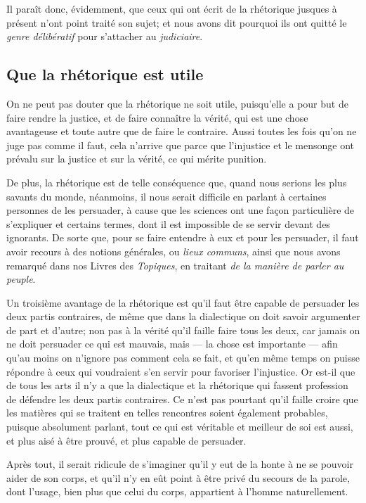 \bigbreak

Il paraît donc, évidemment, que ceux qui ont écrit de la rhétorique jusques à présent n'ont point traité son sujet; et nous avons dit pourquoi ils ont
quitté le \emph{genre délibératif} pour s'attacher au \emph{judiciaire}.

\subsection{Que la rhétorique est utile}

On ne peut pas douter que la rhétorique ne soit utile, puisqu'elle a pour but de faire rendre la justice, et de faire connaître la vérité, qui est
une chose avantageuse et toute autre que de faire le contraire. Aussi toutes les fois qu'on ne juge pas comme il faut, cela n'arrive que parce que
l'injustice et le mensonge ont prévalu sur la justice et sur la vérité, ce qui mérite punition. 

De plus, la rhétorique est de telle conséquence que, quand nous serions les plus savants du monde, néanmoins, il nous serait difficile en parlant à
certaines personnes de les persuader, à cause que les sciences ont une façon particulière de s'expliquer et certains termes, dont il est impossible de
se servir devant des ignorants. De sorte que, pour se faire entendre à eux et pour les persuader, il faut avoir recours à des notions générales, ou
\emph{lieux communs}, ainsi que nous avons remarqué dans nos Livres des \emph{Topiques}, en traitant \emph{de la manière de parler au peuple}.

Un troisième avantage de la rhétorique est qu'il faut être capable de persuader les deux partis contraires, de même que dans la dialectique on doit
savoir argumenter de part et d'autre; non pas à la vérité qu'il faille faire tous les deux, car jamais on ne doit persuader ce qui est mauvais, mais --- la
chose est importante --- afin qu'au moins on n'ignore pas comment cela se fait, et qu'en même temps on puisse répondre à ceux qui voudraient s'en servir
pour favoriser l'injustice. Or est-il que de tous les arts il n'y a que la dialectique et la rhétorique qui fassent profession de défendre les deux partis
contraires. Ce n'est pas pourtant qu'il faille croire que les matières qui se traitent en telles rencontres soient également probables, puisque absolument
parlant, tout ce qui est véritable et meilleur de soi est aussi, et plus aisé à être prouvé, et plus capable de persuader.

Après tout, il serait ridicule de s'imaginer qu'il y eut de la honte à ne se pouvoir aider de son corps, et qu'il n'y en eût point à être privé du secours
de la parole, dont l'usage, bien plus que celui du corps, appartient à l'homme naturellement. 

